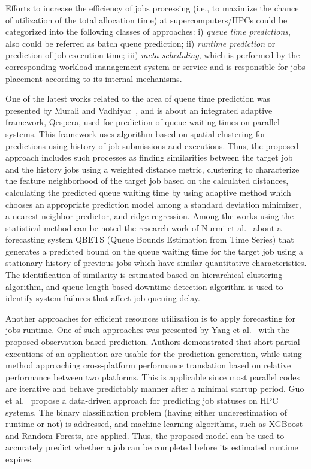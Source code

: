 Efforts to increase the efficiency of jobs processing (i.e., to maximize the chance of utilization of the total allocation time) at supercomputers/HPCs could be categorized into the following classes of approaches: i) \textit{queue time predictions}, also could be referred as batch queue prediction; ii) \textit{runtime prediction} or prediction of job execution time; iii) \textit{meta-scheduling}, which is performed by the corresponding workload management system or service and is responsible for jobs placement according to its internal mechanisms.

One of the latest works related to the area of queue time prediction was presented by Murali and Vadhiyar~\cite{ref-qespera}, and is about an integrated adaptive framework, Qespera, used for prediction of queue waiting times on parallel systems. This framework uses algorithm based on spatial clustering for predictions using history of job submissions and executions. Thus, the proposed approach includes such processes as finding similarities between the target job and the history jobs using a weighted distance metric, clustering to characterize the feature neighborhood of the target job based on the calculated distances, calculating the predicted queue waiting time by using adaptive method which chooses an appropriate prediction model among a standard deviation minimizer, a nearest neighbor predictor, and ridge regression. Among the works using the statistical method can be noted the research work of Nurmi et al.~\cite{ref-qbets} about a forecasting system QBETS (Queue Bounds Estimation from Time Series) that generates a predicted bound on the queue waiting time for the target job using a stationary history of previous jobs which have similar quantitative characteristics. The identification of similarity is estimated based on hierarchical clustering algorithm, and queue length-based downtime detection algorithm is used to identify system failures that affect job queuing delay.

Another approaches for efficient resources utilization is to apply forecasting for jobs runtime. One of such approaches was presented by Yang et al.~\cite{ref-yang} with the proposed observation-based prediction. Authors demonstrated that short partial executions of an application are usable for the prediction generation, while using method approaching cross-platform performance translation based on relative performance between two platforms. This is applicable since most parallel codes are iterative and behave predictably manner after a minimal startup period. Guo et al.~\cite{ref-guo} propose a data-driven approach for predicting job statuses on HPC systems. The binary classification problem (having either underestimation of runtime or not) is addressed, and machine learning algorithms, such as XGBoost and Random Forests, are applied. Thus, the proposed model can be used to accurately predict whether a job can be completed before its estimated runtime expires.

